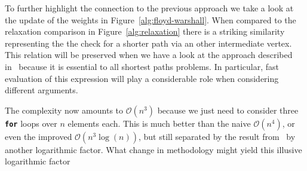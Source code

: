 To further highlight the connection to the previous approach we take a look at the update of the weights in Figure~\ref{alg:floyd-warshall}.
When compared to the relaxation comparison in Figure~\ref{alg:relaxation} there is a striking similarity representing the the check for a shorter path via an other intermediate vertex.
This relation will be preserved when we have a look at the approach described in~\cite{Chan2007} because it is essential to all shortest paths problems.
In particular, fast evaluation of this expression will play a considerable role when considering different arguments.

The complexity now amounts to $\mathcal{O}\left( n^3 \right)$ because we just need to consider three \textbf{\texttt{for}} loops over $n$ elements each.
This is much better than the naive $\mathcal{O}\left( n^4 \right)$, or even the improved $\mathcal{O}\left( n^3 \log(n) \right)$, but still separated by the result from~\cite{Chan2007} by another logarithmic factor.
What change in methodology might yield this illusive logarithmic factor\textinterrobang{}
